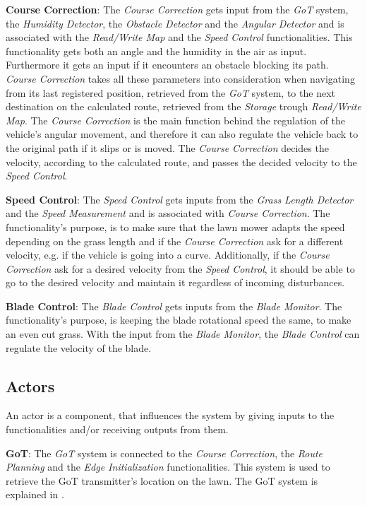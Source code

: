 \textbf{Course Correction}:
The \textit{Course Correction} gets input from the \textit{GoT} system, the \textit{Humidity Detector}, the \textit{Obstacle Detector} and the \textit{Angular Detector} and is associated with the \textit{Read/Write Map} and the \textit{Speed Control} functionalities. This functionality gets both an angle and the humidity in the air as input. Furthermore it gets an input if it encounters an obstacle blocking its path. \textit{Course Correction} takes all these parameters into consideration when navigating from its last registered position, retrieved from the \textit{GoT} system, to the next destination on the calculated route, retrieved from the \textit{Storage} trough \textit{Read/Write Map}. The \textit{Course Correction} is the main function behind the regulation of the vehicle's angular movement, and therefore it can also regulate the vehicle back to the original path if it slips or is moved. The \textit{Course Correction} decides the velocity, according to the calculated route, and passes the decided velocity to the \textit{Speed Control}.

\textbf{Speed Control}:
The \textit{Speed Control} gets inputs from  the \textit{Grass Length Detector} and the \textit{Speed Measurement} and is associated with \textit{Course Correction}. The functionality's purpose, is to make sure that the lawn mower adapts the speed depending on the grass length and if the \textit{Course Correction} ask for a different velocity, e.g. if the vehicle is going into a curve. Additionally, if the \textit{Course Correction} ask for a desired velocity from the \textit{Speed Control}, it should be able to go to the desired velocity and maintain it regardless of incoming disturbances.

\textbf{Blade Control}:
The \textit{Blade Control} gets inputs from the \textit{Blade Monitor}. The functionality's purpose, is keeping the blade rotational speed the same, to make an even cut grass. With the input from the \textit{Blade Monitor}, the \textit{Blade Control} can regulate the velocity of the blade.

\subsection{Actors}
An actor is a component, that influences the system by giving inputs to the functionalities and/or receiving outputs from them.

\textbf{GoT}:
The \textit{GoT} system is connected to the \textit{Course Correction}, the \textit{Route Planning} and the \textit{Edge Initialization} functionalities. This system is used to retrieve the GoT transmitter's location on the lawn. The GoT system is explained in .

